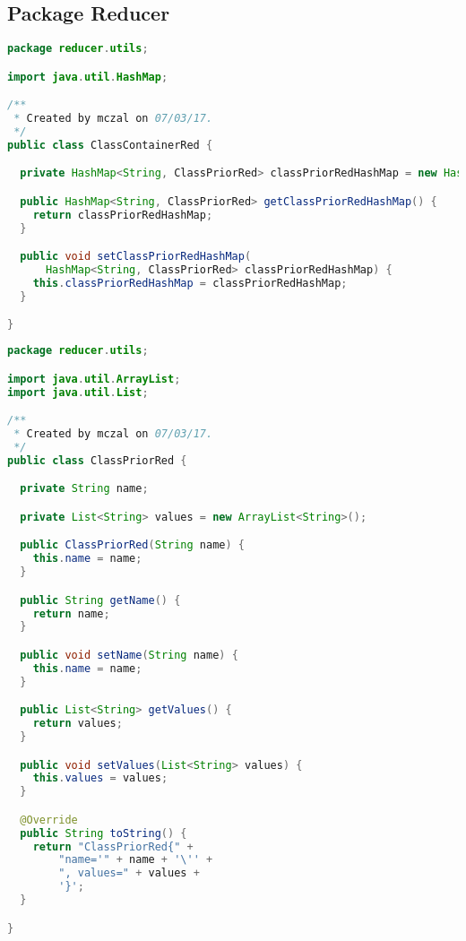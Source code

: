 \subsection{Package Reducer}

\begin{lstlisting}[language=Java,basicstyle=\tiny,caption=ClassContainerRed.java]
package reducer.utils;

import java.util.HashMap;

/**
 * Created by mczal on 07/03/17.
 */
public class ClassContainerRed {

  private HashMap<String, ClassPriorRed> classPriorRedHashMap = new HashMap<String, ClassPriorRed>();

  public HashMap<String, ClassPriorRed> getClassPriorRedHashMap() {
    return classPriorRedHashMap;
  }

  public void setClassPriorRedHashMap(
      HashMap<String, ClassPriorRed> classPriorRedHashMap) {
    this.classPriorRedHashMap = classPriorRedHashMap;
  }

}
\end{lstlisting}


\begin{lstlisting}[language=Java,basicstyle=\tiny,caption=ClassPriorRed.java]
package reducer.utils;

import java.util.ArrayList;
import java.util.List;

/**
 * Created by mczal on 07/03/17.
 */
public class ClassPriorRed {

  private String name;

  private List<String> values = new ArrayList<String>();

  public ClassPriorRed(String name) {
    this.name = name;
  }

  public String getName() {
    return name;
  }

  public void setName(String name) {
    this.name = name;
  }

  public List<String> getValues() {
    return values;
  }

  public void setValues(List<String> values) {
    this.values = values;
  }

  @Override
  public String toString() {
    return "ClassPriorRed{" +
        "name='" + name + '\'' +
        ", values=" + values +
        '}';
  }

}
\end{lstlisting}


